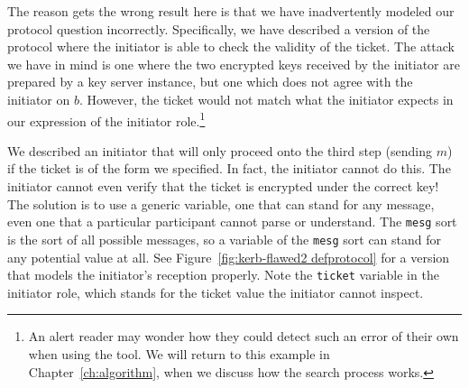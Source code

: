   The reason {\cpsa} gets the wrong
result here is that we have inadvertently modeled our protocol
question incorrectly.  Specifically, we have described a version of
the protocol where the initiator is able to check the validity of the
ticket.  The attack we have in mind is one where the two encrypted
keys received by the initiator are prepared by a key server instance,
but one which does not agree with the initiator on $b$.  However, the
ticket would not match what the initiator expects in our expression of
the initiator role.\footnote{An alert reader may wonder how they could
  detect such an error of their own when using the tool.  We will
  return to this example in Chapter~\ref{ch:algorithm}, when we
  discuss how the {\cpsa} search process works.}

We described an initiator that will only proceed onto the third step
(sending $m$) if the ticket is of the form we specified.  In fact, the
initiator cannot do this.  The initiator cannot even verify that the
ticket is encrypted under the correct key! The solution is to use a
generic variable, one that can stand for any message, even one that a
particular participant cannot parse or understand.  The \texttt{mesg}
sort is the sort of all possible messages, so a variable of the
\texttt{mesg} sort can stand for any potential value at all.  See
Figure~\ref{fig:kerb-flawed2 defprotocol} for a version that models
the initiator's reception properly.  Note the \texttt{ticket} variable
in the initiator role, which stands for the ticket value the initiator
cannot inspect.

